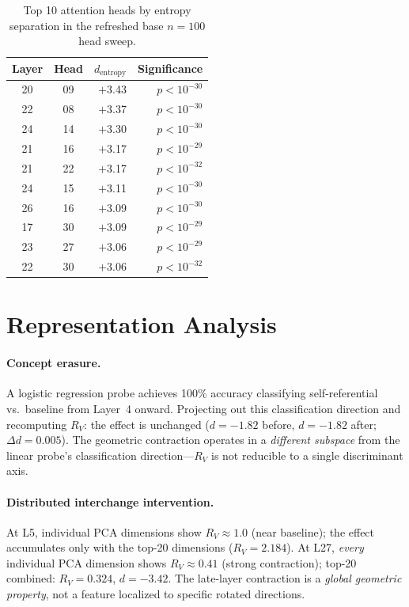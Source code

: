 \documentclass{article}
\newcommand{\RV}{R_V}
\newcommand{\dcohen}{d}
\begin{document}
\begin{table}[ht]
\centering
\caption{Top 10 attention heads by entropy separation in the refreshed base $n = 100$ head sweep.}
\small
\begin{tabular}{ccrr}
\toprule
Layer & Head & $\dcohen_\mathrm{entropy}$ & Significance \\
\midrule
20 & 09 & $+$3.43 & $p < 10^{-30}$ \\
22 & 08 & $+$3.37 & $p < 10^{-30}$ \\
24 & 14 & $+$3.30 & $p < 10^{-30}$ \\
21 & 16 & $+$3.17 & $p < 10^{-29}$ \\
21 & 22 & $+$3.17 & $p < 10^{-32}$ \\
24 & 15 & $+$3.11 & $p < 10^{-30}$ \\
26 & 16 & $+$3.09 & $p < 10^{-30}$ \\
17 & 30 & $+$3.09 & $p < 10^{-29}$ \\
23 & 27 & $+$3.06 & $p < 10^{-29}$ \\
22 & 30 & $+$3.06 & $p < 10^{-32}$ \\
\bottomrule
\end{tabular}
\end{table}


\section{Representation Analysis}
\label{app:representation}

\paragraph{Concept erasure.}
A logistic regression probe achieves 100\% accuracy classifying self-referential vs.\ baseline
from Layer~4 onward.
Projecting out this classification direction and recomputing $\RV$: the effect is unchanged
($\dcohen = -1.82$ before, $\dcohen = -1.82$ after; $\Delta d = 0.005$).
The geometric contraction operates in a \emph{different subspace} from the linear probe's
classification direction---$\RV$ is not reducible to a single discriminant axis.

\paragraph{Distributed interchange intervention.}
At L5, individual PCA dimensions show $\RV \approx 1.0$ (near baseline); the effect accumulates
only with the top-20 dimensions ($\RV = 2.184$).
At L27, \emph{every} individual PCA dimension shows $\RV \approx 0.41$ (strong contraction);
top-20 combined: $\RV = 0.324$, $\dcohen = -3.42$.
The late-layer contraction is a \emph{global geometric property}, not a feature localized
to specific rotated directions.
\end{document}
